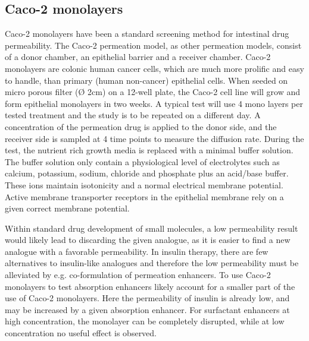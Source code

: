 \subsection{Caco-2 monolayers}
Caco-2 monolayers have been a standard screening method for intestinal drug permeability. The Caco-2 permeation model, as other permeation models, consist of a donor chamber, an epithelial barrier and a receiver chamber. Caco-2 monolayers are colonic human cancer cells, which are much more prolific and easy to handle, than primary (human non-cancer) epithelial cells. When seeded on micro porous filter (Ø 2cm) on a 12-well plate, the Caco-2 cell line will grow and form epithelial monolayers in two weeks. A typical test will use 4 mono layers per tested treatment and the study is to be repeated on a different day. A concentration of the permeation drug is applied to the donor side, and the receiver side is sampled at 4 time points to measure the diffusion rate. During the test, the nutrient rich growth media is replaced with a minimal buffer solution. The buffer solution only contain a physiological level of electrolytes such as calcium, potassium, sodium, chloride and phosphate plus an acid/base buffer. These ions maintain isotonicity and a normal electrical membrane potential. Active membrane transporter receptors in the epithelial membrane rely on a given correct membrane potential.

Within standard drug development of small molecules, a low permeability result would likely lead to discarding the given analogue, as it is easier to find a new analogue with a favorable permeability. In insulin therapy, there are few alternatives to insulin-like analogues and therefore the low permeability must be alleviated by e.g. co-formulation of permeation enhancers. To use Caco-2 monolayers to test absorption enhancers likely account for a smaller part of the use of Caco-2 monolayers. Here the permeability of insulin is already low, and may be increased by a given absorption enhancer. For surfactant enhancers at high concentration, the monolayer can be completely disrupted, while at low concentration no useful effect is observed.

